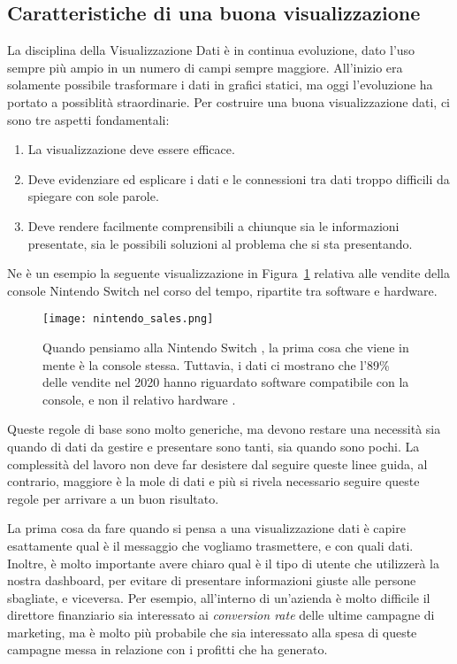 \subsection{Caratteristiche di una buona visualizzazione}
La disciplina della Visualizzazione Dati è in continua evoluzione, dato l'uso sempre più ampio in un numero di campi sempre maggiore. All'inizio era solamente possibile trasformare i dati in grafici statici, ma oggi l'evoluzione ha portato a possiblità straordinarie.
Per costruire una buona visualizzazione dati, ci sono tre aspetti fondamentali:
\begin{enumerate}
    \item La visualizzazione deve essere efficace.
    \item Deve evidenziare ed esplicare i dati e le connessioni tra dati troppo difficili da spiegare con sole parole.
    \item Deve rendere facilmente comprensibili a chiunque sia le informazioni presentate, sia le possibili soluzioni al problema che si sta presentando.
\end{enumerate}
Ne è un esempio la seguente visualizzazione in Figura~\ref{fig:nintendo_sales} relativa alle vendite della console Nintendo Switch \texttrademark nel corso del tempo, ripartite tra software e hardware.
\begin{figure}
    \centering
    \texttt{[image: nintendo\_sales.png]}
    \caption[Dataviz: vendite di console Nintendo Switch]{Quando pensiamo alla Nintendo Switch \texttrademark, la prima cosa che viene in mente è la console stessa. Tuttavia, i dati ci mostrano che l'89\% delle vendite nel 2020 hanno riguardato software compatibile con la console, e non il relativo hardware \cite{DataVisualization_Caratteristiche}.}
    \label{fig:nintendo_sales}
\end{figure}

Queste regole di base sono molto generiche, ma devono restare una necessità sia quando di dati da gestire e presentare sono tanti, sia quando sono pochi. La complessità del lavoro non deve far desistere dal seguire queste linee guida, al contrario, maggiore è la mole di dati e più si rivela necessario seguire queste regole per arrivare a un buon risultato.

La prima cosa da fare quando si pensa a una visualizzazione dati è capire esattamente qual è il messaggio che vogliamo trasmettere, e con quali dati. Inoltre, è molto importante avere chiaro qual è il tipo di utente che utilizzerà la nostra dashboard, per evitare di presentare informazioni giuste alle persone sbagliate, e viceversa. Per esempio, all'interno di un'azienda è molto difficile il direttore finanziario sia interessato ai \textit{conversion rate} delle ultime campagne di marketing, ma è molto più probabile che sia interessato alla spesa di queste campagne messa in relazione con i profitti che ha generato.

